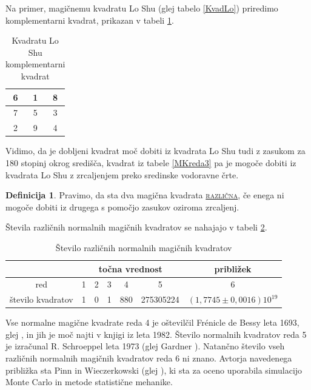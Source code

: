 \documentclass[a4paper,12pt]{article}
\newenvironment{magic}[3]
{
   \begin{table}[!ht]
      \centering
      \caption{#2}
      \label{#3}
      \large
      \begin{tabular}{#1}
         \hline 
}{
      \end{tabular}
      \normalsize
   \end{table}
}
\newcommand{\pojem}[1]{\underline{\textsc{#1}}}
\theoremstyle{definition}
\newtheorem{definicija}{Definicija}
\theoremstyle{definition}
\begin{document}
Na primer, magičnemu kvadratu Lo Shu (glej tabelo \ref{KvadLo}) priredimo
komplementarni kvadrat, prikazan v tabeli \ref{KvadKompLo}.

\begin{magic}{|c|c|c|}{Kvadratu Lo Shu komplementarni kvadrat}{KvadKompLo}
   6 & 1 & 8 \\\hline
   7 & 5 & 3 \\\hline
   2 & 9 & 4 \\\hline
\end{magic}

Vidimo, da je dobljeni kvadrat moč dobiti iz kvadrata Lo Shu tudi z zasukom za
180 stopinj okrog središča, kvadrat iz tabele \ref{MKreda3} pa je mogoče dobiti
iz kvadrata Lo Shu z zrcaljenjem preko sredinske vodoravne črte.

\begin{definicija}
   Pravimo, da sta dva magična kvadrata \pojem{različna}, če enega ni mogoče 
   dobiti iz drugega s pomočjo zasukov oziroma zrcaljenj.
\end{definicija}

Števila različnih normalnih magičnih kvadratov se nahajajo v tabeli \ref{tab7}.

\begin{table}[!ht]
   \centering
   \caption{Število različnih normalnih magičnih kvadratov}
   \begin{tabular}{|c|c|c|c|c|c|c|}
      \hline
      & \multicolumn{5}{c}{točna vrednost} & približek     \\ \hline
      red & 1 & 2 & 3 & 4 & 5 & 6                          \\ \hline
      število kvadratov & 1 & 0 & 1 & 880 & 275305224 & 
      $ (1,7745 \pm 0,0016) 10^{19} $                      \\ \hline
   \end{tabular}
   \label{tab7}
\end{table}

Vse normalne magične kvadrate reda 4 je oštevilčil Frénicle de Bessy
leta 1693, glej \cite{bessy}, in jih je moč najti v knjigi \cite{berlekamp}
iz leta 1982. Število normalnih kvadratov reda 5 je izračunal
R. Schroeppel leta 1973 (glej Gardner \cite{gardner}).
Natančno število vseh različnih normalnih magičnih kvadratov reda 6 ni znano.
Avtorja navedenega približka sta Pinn in Wieczerkowski (glej \cite{pinn}), ki
sta za oceno uporabila simulacijo Monte Carlo in metode statistične mehanike.

\end{document}
